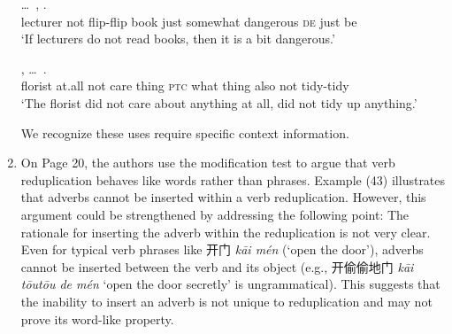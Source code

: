 \documentclass[fleqn,twoside]{article}
\begin{document}
\begin{enumerate}
    
    
    \ex\label{ex:neg2}
    \gll {} \ldots\,   ,      .\\
    lecturer {} not flip-flip book just somewhat dangerous \textsc{de} just be\\ 
    \glt `If lecturers do not read books, then it is a bit dangerous.'
    
    \ex\label{ex:neg3}
    \gll {}     , \ldots\,     .\\
    florist at.all not care thing \textsc{ptc} {} what thing also not tidy-tidy\\ 
    \glt `The florist did not care about anything at all, did not tidy up anything.'
\z
    
    We recognize these uses require specific context information.
    
    
    \item On Page 20, the authors use the modification test \citep{Dai1992} to argue that verb reduplication behaves like words rather than phrases. Example (43) illustrates that adverbs cannot be inserted within a verb reduplication. However, this argument could be strengthened by addressing the following point: The rationale for inserting the adverb within the reduplication is not very clear. Even for typical verb phrases like 开门 \textit{kāi mén} (`open the door'), adverbs cannot be inserted between the verb and its
    object (e.g., 开偷偷地门 \textit{kāi tōutōu de mén} `open the door secretly' is ungrammatical).
    This suggests that the inability to insert an adverb is not unique to reduplication and may not prove its word-like property.
    

\end{enumerate}
\end{document}
